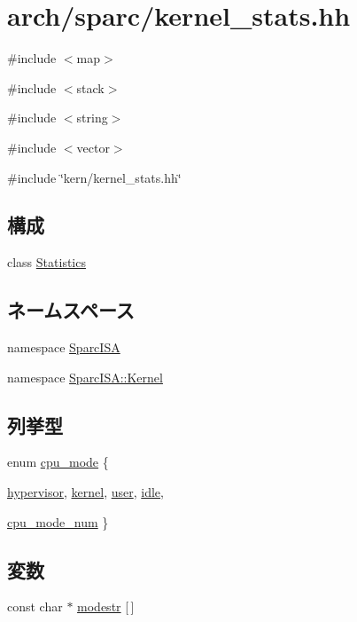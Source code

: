 \hypertarget{arch_2sparc_2kernel__stats_8hh}{
\section{arch/sparc/kernel\_\-stats.hh}
\label{arch_2sparc_2kernel__stats_8hh}
}
{\ttfamily \#include $<$map$>$}\par
{\ttfamily \#include $<$stack$>$}\par
{\ttfamily \#include $<$string$>$}\par
{\ttfamily \#include $<$vector$>$}\par
{\ttfamily \#include \char`\"{}kern/kernel\_\-stats.hh\char`\"{}}\par
\subsection*{構成}
\begin{DoxyCompactItemize}
\item 
class \hyperlink{classSparcISA_1_1Kernel_1_1Statistics}{Statistics}
\end{DoxyCompactItemize}
\subsection*{ネームスペース}
\begin{DoxyCompactItemize}
\item 
namespace \hyperlink{namespaceSparcISA}{SparcISA}
\item 
namespace \hyperlink{namespaceSparcISA_1_1Kernel}{SparcISA::Kernel}
\end{DoxyCompactItemize}
\subsection*{列挙型}
\begin{DoxyCompactItemize}
\item 
enum \hyperlink{namespaceSparcISA_1_1Kernel_aa1fc3805dac6f71f457fbbc263105bf6}{cpu\_\-mode} \{ \par
\hyperlink{namespaceSparcISA_1_1Kernel_aa1fc3805dac6f71f457fbbc263105bf6a91b640fcbd5e0f6c8310b554caa00d4b}{hypervisor}, 
\hyperlink{namespaceSparcISA_1_1Kernel_aa1fc3805dac6f71f457fbbc263105bf6adb0339d028e596254368234e5ab09f9d}{kernel}, 
\hyperlink{namespaceSparcISA_1_1Kernel_aa1fc3805dac6f71f457fbbc263105bf6a04981b8c09a50ccfb1d92fc11b81c36a}{user}, 
\hyperlink{namespaceSparcISA_1_1Kernel_aa1fc3805dac6f71f457fbbc263105bf6a0e9a37114c0e458d28d52f06ec0f2242}{idle}, 
\par
\hyperlink{namespaceSparcISA_1_1Kernel_aa1fc3805dac6f71f457fbbc263105bf6a4572f7cf10830e04921c8896f22102ba}{cpu\_\-mode\_\-num}
 \}
\end{DoxyCompactItemize}
\subsection*{変数}
\begin{DoxyCompactItemize}
\item 
const char $\ast$ \hyperlink{namespaceSparcISA_1_1Kernel_aaab5092bc6d1c40a90ff4c7450649ace}{modestr} \mbox{[}$\,$\mbox{]}
\end{DoxyCompactItemize}
